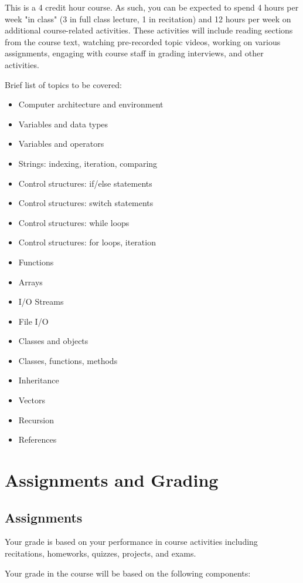 This is a 4 credit hour course. As such, you can be expected to spend 4 hours per week "in class" (3 in full class lecture, 1 in recitation) and 12 hours per week on additional course-related activities. These activities will include reading sections from the course text, watching pre-recorded topic videos, working on various assignments, engaging with course staff in grading interviews, and other activities.

Brief list of topics to be covered:
\begin{itemize}
    \item Computer architecture and environment
    \item Variables and data types
    \item Variables and operators
    \item Strings: indexing, iteration, comparing
    \item Control structures: if/else statements
    \item Control structures: switch statements
    \item Control structures: while loops
    \item Control structures: for loops, iteration
    \item Functions
    \item Arrays
    \item I/O Streams
    \item File I/O
    \item Classes and objects
    \item Classes, functions, methods
    \item Inheritance
    \item Vectors
    \item Recursion
    \item References
\end{itemize}

\section{Assignments and Grading}
\subsection{Assignments}
Your grade is based on your performance in course activities including recitations, homeworks, quizzes, projects, and exams. 

Your grade in the course will be based on the following components:

